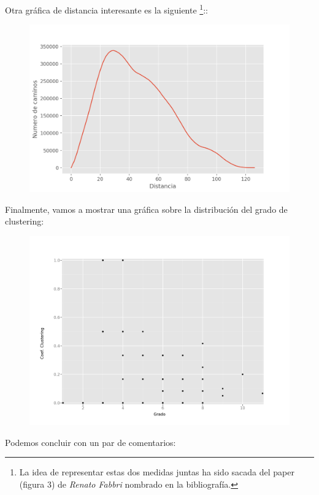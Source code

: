 \documentclass[11pt]{article}
\begin{document}
Otra gráfica de distancia interesante es la siguiente \footnote{La idea de representar estas dos medidas juntas ha sido sacada del paper (figura 3) de \textit{Renato Fabbri} nombrado en la bibliografía.}::

\begin{figure}[H]
	\centering
	\includegraphics[scale=0.5]{images/2_1_distance.png}
\end{figure}

Finalmente, vamos a mostrar una gráfica sobre la distribución del grado de clustering:

\begin{figure}[H]
	\centering
	\includegraphics[scale=0.35]{images/2_1_clustering.png}
\end{figure}

Podemos concluir con un par de comentarios:
\end{document}

